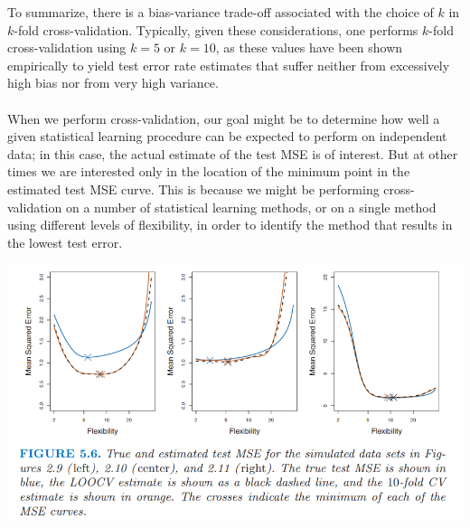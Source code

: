 To summarize, there is a bias-variance trade-off associated with the
choice of $k$ in $k$-fold cross-validation. Typically, given these considerations, one performs $k$-fold cross-validation using $k = 5$ or $k = 10$, as these values have been shown empirically to yield test error rate estimates that suffer neither from excessively high bias nor from very high variance.\\\\
When we perform cross-validation, our goal might be to determine how
well a given statistical learning procedure can be expected to perform on independent data; in this case, the actual estimate of the test MSE is of interest. But at other times we are interested only in the location of the minimum point in the estimated test MSE curve. This is because we might be performing cross-validation on a number of statistical learning methods, or on a single method using different levels of flexibility, in order to identify the method that results in the lowest test error.
\begin{center}
    \includegraphics[scale=0.7]{images/k-fold-cv2.png}
\end{center}

